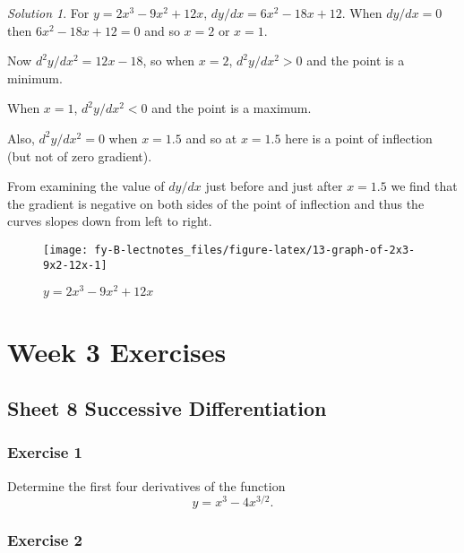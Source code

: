 \documentclass[
  11pt,
  oneside]{book}
\newcommand{\slide}{}
\theoremstyle{definition}
\theoremstyle{definition}
\theoremstyle{definition}
\theoremstyle{definition}
\theoremstyle{remark}
\newtheorem*{solution}{Solution}
\begin{document}
\begin{solution}

For \(y = 2x^3-9x^2+12x\), \(dy/dx = 6x^2-18x+12\). When \(dy/dx=0\) then \(6x^2-18x+12=0\) and so \(x=2\) or \(x=1\).

Now \(d^2y/dx^2 = 12x-18\), so when \(x=2\), \(d^2y/dx^2>0\) and the point is a minimum.

When \(x=1\), \(d^2y/dx^2<0\) and the point is a maximum.

Also, \(d^2y/dx^2=0\) when \(x=1.5\) and so at \(x=1.5\) here is a point of inflection (but not of zero gradient).

From examining the value of \(dy/dx\) just before and just after \(x=1.5\) we find that the gradient is negative on both sides of the point of inflection and thus the curves slopes down from left to right.

\begin{figure}

{\centering \texttt{[image: fy-B-lectnotes\_files/figure-latex/13-graph-of-2x3-9x2-12x-1]} 

}

\caption{$y = 2x^3-9x^2+12x$}\label{fig:13-graph-of-2x3-9x2-12x}
\end{figure}

\end{solution}

\chapter*{Week 3 Exercises}\label{week-3-exercises}

\section{Sheet 8 Successive Differentiation}\label{sheet-8-successive-differentiation}

\subsection*{Exercise 1}\label{exercise-1-2}

Determine the first four derivatives of the function
\[
y=x^3-4x^{3/2}.
\]
\slide

\subsection*{Exercise 2}\label{exercise-2-2}
\end{document}
